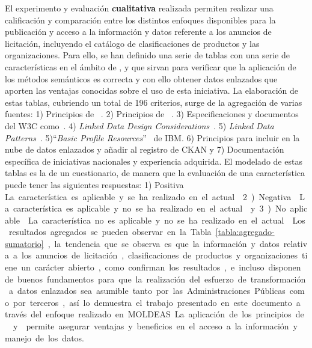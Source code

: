 \documentclass[a4paper,final,11pt,fleqn,twoside]{book}  %
\begin{document}
El experimento y evaluación \textbf{cualitativa} realizada permiten realizar una calificación y comparación entre los distintos enfoques 
disponibles para la publicación y acceso a la información y datos referente a los anuncios de licitación, incluyendo
el catálogo de clasificaciones de productos y las organizaciones. Para ello, se han definido una serie de tablas 
con una serie de características en el ámbito de \linkeddata, \opendata y \lod que sirvan para verificar que
la aplicación de los métodos semánticos es correcta y con ello obtener datos enlazados que aporten las ventajas conocidas sobre el uso
de esta iniciativa. La elaboración de estas tablas, cubriendo un total de 196 criterios, surge de la agregación de varias fuentes: 1) Principios de \linkeddata~\cite{Berners-Lee-2006}. 2) Principios de \opendata~\cite{okfn}. 
3) Especificaciones y documentos del W3C como~\cite{publishing-ogd,linked-data-cookbook,Berr08}. 4) \textit{Linked Data Design Considerations}~\cite{Heath_Bizer_2011}. 5) \textit{Linked Data Patterns}~\cite{linked-data-patterns}. 
5)``\textit{Basic Profile Resources}''~\cite{basic-profile-ibm} de IBM. 6) Principios para incluir \datasets en la nube de datos 
enlazados y añadir al registro de CKAN y 7) Documentación específica de iniciativas nacionales y experiencia adquirida. El 
modelado de estas tablas es la de un cuestionario, de manera que la evaluación de una característica puede tener las siguientes 
respuestas: 1) Positiva \si. La característica es aplicable y se ha realizado en el actual \dataset. 2) 
Negativa \no. La característica es aplicable y no se ha realizado en el actual \dataset y 3) No aplicable \na. 
La característica no es aplicable y no se ha realizado en el actual \dataset. Los resultados agregados se pueden observar en la 
Tabla~\ref{tabla:agregado-sumatorio}, la tendencia que se observa  es que la información y datos relativa a los anuncios de licitación, 
clasificaciones de productos y organizaciones tiene un carácter abierto, como confirman los resultados, e incluso disponen
de buenos fundamentos para que la realización del esfuerzo de transformación a datos enlazados sea asumible tanto 
por las Administraciones Públicas como por terceros, así lo demuestra el trabajo presentado en este documento 
a través del enfoque realizado en MOLDEAS. La aplicación de los principios de \linkeddata y \opendata permite 
asegurar ventajas y beneficios en el acceso a la información y manejo de los datos.
\end{document}
